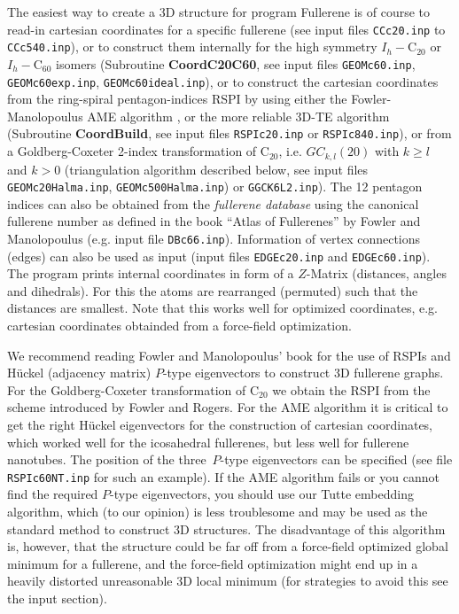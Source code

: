 \documentclass[article,a4paper,twoside]{memoir}
\newcommand{\C}[1]{\ensuremath{\mathrm{C}_{#1}}}
\newcommand{\filename}[1]{\texttt{#1}}
\newcommand{\funname}[1]{{\color{blue}\textbf{#1}}}
\begin{document}
The easiest way to create a 3D structure for program Fullerene is of course to read-in cartesian coordinates for a specific
fullerene (see input files \filename{CCc20.inp} to \filename{CCc540.inp}), or to construct them internally for the high
symmetry $I_h-$\C{20} or $I_h-$\C{60} isomers (Subroutine \funname{CoordC20C60}, see input files \filename{GEOMc60.inp},
\filename{GEOMc60exp.inp}, \filename{GEOMc60ideal.inp}), or to construct the cartesian coordinates from the ring-spiral
pentagon-indices RSPI by using either the Fowler-Manolopoulus AME algorithm \cite{Atlas},
or the more reliable 3D-TE algorithm (Subroutine \funname{CoordBuild}, see input files \filename{RSPIc20.inp} or \filename{RSPIc840.inp}),
or from a Goldberg-Coxeter 2-index transformation of \C{20}, i.e. $GC_{k,l}(20)$ with $k \geq l$ and $k > 0$
(triangulation algorithm described below, see input files \filename{GEOMc20Halma.inp}, \filename{GEOMc500Halma.inp}) or \filename{GGCK6L2.inp}). 
The 12 pentagon indices can also be obtained from the \textit{fullerene database} using 
the canonical fullerene number as defined in the book ``Atlas of Fullerenes'' by Fowler and Manolopoulus \cite{Atlas,cvetkovic2002} 
(e.g. input file \filename{DBc66.inp}). Information of vertex connections (edges) can also be used as input 
(input files \filename{EDGEc20.inp} and \filename{EDGEc60.inp}).
The program prints internal coordinates in form of a $Z$-Matrix (distances, angles and dihedrals).
For this the atoms are rearranged (permuted) such that the distances are smallest. Note that this works well for optimized
coordinates, e.g. cartesian coordinates obtainded from a force-field optimization.

We recommend reading Fowler and Manolopoulus' book \cite{Atlas,cvetkovic2002} for the use of RSPIs and H\"uckel (adjacency matrix) $P$-type eigenvectors 
to construct 3D fullerene graphs. For the Goldberg-Coxeter transformation of \C{20} we obtain the RSPI from the scheme introduced by
Fowler and Rogers.\cite{Rogers} For the AME algorithm it is critical to get the right 
H\"uckel eigenvectors for the construction of cartesian coordinates,\cite{Atlas} which worked well for the icosahedral
fullerenes, but less well for fullerene nanotubes. 
The position of the three~$P$-type eigenvectors can be specified (see file \filename{RSPIc60NT.inp} for such an example).
If the AME algorithm fails or you cannot find the required $P$-type eigenvectors, you should use our Tutte embedding algorithm,
which (to our opinion) is less troublesome and may be used as the standard method to construct 3D structures. The disadvantage
of this algorithm is, however, that the structure could be far off from a force-field optimized global minimum for a fullerene, and the
force-field optimization might end up in a heavily distorted unreasonable 3D local minimum (for strategies to avoid this
see the input section).
\end{document}
